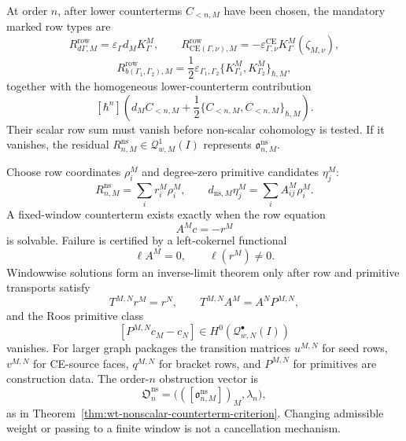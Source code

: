 \begin{enumerate}
  At order \(n\), after lower counterterms \(C_{<n,M}\) have been chosen,
  the mandatory marked row types are
  \[
    R^{\mathrm{row}}_{d\Gamma,M}
      =
    \varepsilon_\Gamma d_MK^M_\Gamma,\qquad
    R^{\mathrm{row}}_{\mathrm{CE}(\Gamma,\nu),M}
      =
    -\varepsilon^{\mathrm{CE}}_{\Gamma,\nu}K^M_\Gamma(\zeta_{M,\nu}),
  \]
  \[
    R^{\mathrm{row}}_{b(\Gamma_1,\Gamma_2),M}
      =
    \frac12\varepsilon_{\Gamma_1,\Gamma_2}
    \{K^M_{\Gamma_1},K^M_{\Gamma_2}\}_{\hbar,M},
  \]
  together with the homogeneous lower-counterterm contribution
  \[
    [\hbar^n]\left(
      d_MC_{<n,M}
      +\frac12\{C_{<n,M},C_{<n,M}\}_{\hbar,M}
    \right).
  \]
  Their scalar row sum must vanish before non-scalar cohomology is
  tested.  If it vanishes, the residual
  \(R^{\mathrm{ns}}_{n,M}\in\mathcal Q^1_{w,M}(I)\) represents
  \(\mathfrak o^{\mathrm{ns}}_{n,M}\).

  Choose row coordinates \(\rho^M_i\) and degree-zero primitive
  candidates \(\eta^M_j\):
  \[
    R^{\mathrm{ns}}_{n,M}=\sum_i r^M_i\rho^M_i,\qquad
    d_{\mathrm{ns},M}\eta^M_j=\sum_iA^M_{ij}\rho^M_i .
  \]
  A fixed-window counterterm exists exactly when the row equation
  \[
    A^Mc=-r^M
  \]
  is solvable.  Failure is certified by a left-cokernel functional
  \[
    \ell A^M=0,\qquad \ell(r^M)\ne0 .
  \]
  Windowwise solutions form an inverse-limit theorem only after row and
  primitive transports satisfy
  \[
    T^{M,N}r^M=r^N,\qquad
    T^{M,N}A^M=A^NP^{M,N},
  \]
  and the Roos primitive class
  \[
    [P^{M,N}c_M-c_N]\in H^0(\mathcal Q^\bullet_{w,N}(I))
  \]
  vanishes.  For larger graph packages the transition matrices
  \(u^{M,N}\) for seed rows, \(v^{M,N}\) for CE-source faces,
  \(q^{M,N}\) for bracket rows, and \(P^{M,N}\) for primitives are
  construction data.  The order-\(n\) obstruction vector is
  \[
    \mathfrak O^{\mathrm{ns}}_n
      =
    \bigl(([\mathfrak o^{\mathrm{ns}}_{n,M}])_M,\lambda_n\bigr),
  \]
  as in Theorem~\ref{thm:wt-nonscalar-counterterm-criterion}.
  Changing admissible weight or passing to a finite window is not a
  cancellation mechanism.


\end{enumerate}
